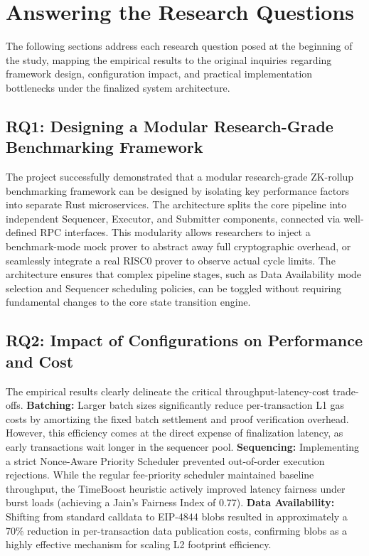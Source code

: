 \section{Answering the Research Questions}
\label{sec:rq_answers}
The following sections address each research question posed at the beginning of the study, mapping the empirical results to the original inquiries regarding framework design, configuration impact, and practical implementation bottlenecks under the finalized system architecture.

\subsection{RQ1: Designing a Modular Research-Grade Benchmarking Framework}
The project successfully demonstrated that a modular research-grade ZK-rollup benchmarking framework can be designed by isolating key performance factors into separate Rust microservices. The architecture splits the core pipeline into independent Sequencer, Executor, and Submitter components, connected via well-defined RPC interfaces. This modularity allows researchers to inject a benchmark-mode mock prover to abstract away full cryptographic overhead, or seamlessly integrate a real RISC0 prover to observe actual cycle limits. The architecture ensures that complex pipeline stages, such as Data Availability mode selection and Sequencer scheduling policies, can be toggled without requiring fundamental changes to the core state transition engine.

\subsection{RQ2: Impact of Configurations on Performance and Cost}
The empirical results clearly delineate the critical throughput-latency-cost trade-offs. 
\textbf{Batching:} Larger batch sizes significantly reduce per-transaction L1 gas costs by amortizing the fixed batch settlement and proof verification overhead. However, this efficiency comes at the direct expense of finalization latency, as early transactions wait longer in the sequencer pool.
\textbf{Sequencing:} Implementing a strict Nonce-Aware Priority Scheduler prevented out-of-order execution rejections. While the regular fee-priority scheduler maintained baseline throughput, the TimeBoost heuristic actively improved latency fairness under burst loads (achieving a Jain's Fairness Index of 0.77).
\textbf{Data Availability:} Shifting from standard calldata to EIP-4844 blobs resulted in approximately a 70\% reduction in per-transaction data publication costs, confirming blobs as a highly effective mechanism for scaling L2 footprint efficiency.

